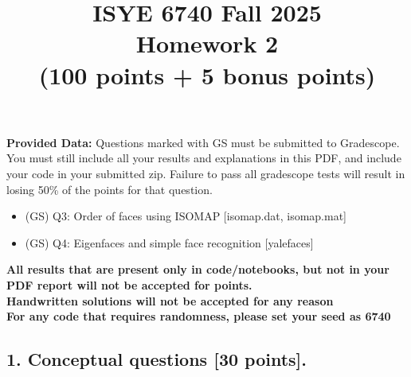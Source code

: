 \documentclass[twoside,10pt]{article}
\begin{document}
\title{ISYE 6740 Fall 2025\\ Homework 2 \\
(100 points + 5 bonus points)}
\date{}

\maketitle

\textbf{Provided Data:}
Questions marked with GS must be submitted to Gradescope. You must still include all your results and explanations in this PDF, and include your code in your submitted zip. Failure to pass all gradescope tests will result in losing 50\% of the points for that question.

\begin{itemize}
    \item (GS) Q3: Order of faces using ISOMAP [isomap.dat, isomap.mat]
    \item (GS) Q4: Eigenfaces and simple face recognition [yalefaces]
\end{itemize}

\leavevmode\newline
\textbf{All results that are present only in code/notebooks, but not in your PDF report will not be accepted for points.}\\
\textbf{Handwritten solutions will not be accepted for any reason}\\
\textbf{For any code that requires randomness, please set your seed as 6740}

\subsection*{1. Conceptual questions [30 points].}
\end{document}
